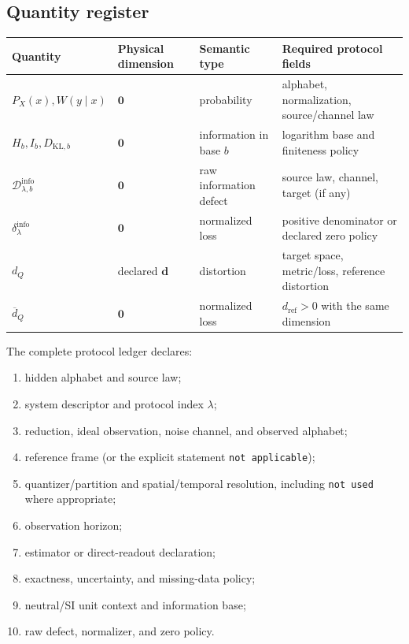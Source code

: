 \documentclass[11pt,a4paper]{article}
\theoremstyle{definition}
\theoremstyle{plain}
\theoremstyle{remark}
\newcommand{\1}{\mathbf{1}}
\newcommand{\Hb}{H_b}
\newcommand{\Ib}{I_b}
\newcommand{\Dinfo}{\mathscr{D}^{\mathrm{info}}}
\newcommand{\dinfo}{\delta^{\mathrm{info}}}
\begin{document}
\subsection{Quantity register}

\begin{center}
\small
\begin{tabularx}{\linewidth}{@{}L{29mm}L{22mm}L{27mm}Y@{}}
\toprule
Quantity & Physical dimension & Semantic type & Required protocol fields\\
\midrule
$P_X(x),W(y\mid x)$ & $\mathbf0$ & probability
& alphabet, normalization, source/channel law\\
$\Hb,\Ib,D_{\mathrm{KL},b}$ & $\mathbf0$ & information in base $b$
& logarithm base and finiteness policy\\
$\Dinfo_{\lambda,b}$ & $\mathbf0$ & raw information defect
& source law, channel, target (if any)\\
$\dinfo_\lambda$ & $\mathbf0$ & normalized loss
& positive denominator or declared zero policy\\
$d_Q$ & declared $\mathbf d$ & distortion
& target space, metric/loss, reference distortion\\
$\overline d_Q$ & $\mathbf0$ & normalized loss
& $d_{\mathrm{ref}}>0$ with the same dimension\\
\bottomrule
\end{tabularx}
\end{center}

The complete protocol ledger declares:
\begin{enumerate}[leftmargin=*,itemsep=2pt]
\item hidden alphabet and source law;
\item system descriptor and protocol index $\lambda$;
\item reduction, ideal observation, noise channel, and observed alphabet;
\item reference frame (or the explicit statement \texttt{not applicable});
\item quantizer/partition and spatial/temporal resolution, including
      \texttt{not used} where appropriate;
\item observation horizon;
\item estimator or direct-readout declaration;
\item exactness, uncertainty, and missing-data policy;
\item neutral/SI unit context and information base;
\item raw defect, normalizer, and zero policy.
\end{enumerate}
\end{document}
